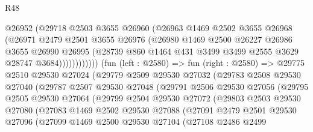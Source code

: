 \begin{lexlean}{R48}
\begin{coremodule}
                      @26952
                      (@29718
                        @2503
                        @3655
                        @26960
                        (@26963
                          @1469
                          @2502
                          @3655
                          @26968
                          (@26971
                            @2479
                            @2501
                            @3655
                            @26976
                            (@26980
                              @1469
                              @2500
                              @26227
                              @26986
                              @3655
                              @26990
                              @26995
                              (@28739
                                @860
                                @1464
                                @431
                                @3499
                                @3499
                                @2555
                                @3629
                                @28747
                                @3684))))))))))))
        (fun (left : @2580) =>
        fun (right : @2580) =>
        @29775
          @2510
          @29530
          @27024
          (@29779
            @2509
            @29530
            @27032
            (@29783
              @2508
              @29530
              @27040
              (@29787
                @2507
                @29530
                @27048
                (@29791
                  @2506
                  @29530
                  @27056
                  (@29795
                    @2505
                    @29530
                    @27064
                    (@29799
                      @2504
                      @29530
                      @27072
                      (@29803
                        @2503
                        @29530
                        @27080
                        (@27083
                          @1469
                          @2502
                          @29530
                          @27088
                          (@27091
                            @2479
                            @2501
                            @29530
                            @27096
                            (@27099
                              @1469
                              @2500
                              @29530
                              @27104
                              (@27108
                                @2486
                                @2499

\end{coremodule}
\end{lexlean}
